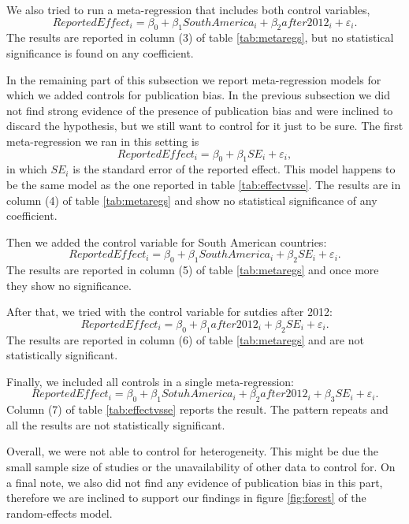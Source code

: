 \documentclass[a4paper, 10pt]{article}
\begin{document}
We also tried to run a meta-regression that includes both control variables,
\begin{equation}
    ReportedEffect_i = \beta_0 + \beta_1 SouthAmerica_i + \beta_2 after2012_i + \varepsilon_i.
\end{equation}
The results are reported in column (3) of table \ref{tab:metaregs}, but no statistical significance is found on any coefficient.

In the remaining part of this subsection we report meta-regression models for which we added controls for publication bias. In the previous subsection we did not find strong evidence of the presence of publication bias and were inclined to discard the hypothesis, but we still want to control for it just to be sure. The first meta-regression we ran in this setting is
\begin{equation}
    ReportedEffect_i = \beta_0 + \beta_1 SE_i + \varepsilon_i,
\end{equation}
in which $SE_i$ is the standard error of the reported effect. This model happens to be the same model as the one reported in table \ref{tab:effectvsse}. The results are in column (4) of table \ref{tab:metaregs} and show no statistical significance of any coefficient.

Then we added the control variable for South American countries:
\begin{equation}
    ReportedEffect_i = \beta_0 + \beta_1 SouthAmerica_i + \beta_2 SE_i + \varepsilon_i.
\end{equation}
The results are reported in column (5) of table \ref{tab:metaregs} and once more they show no significance.

After that, we tried with the control variable for sutdies after 2012:
\begin{equation}
    ReportedEffect_i = \beta_0 + \beta_1 after2012_i + \beta_2 SE_i + \varepsilon_i.
\end{equation}
The results are reported in column (6) of table \ref{tab:metaregs} and are not statistically significant.

Finally, we included all controls in a single meta-regression:
\begin{equation}
    ReportedEffect_i = \beta_0 + \beta_1 SotuhAmerica_i + \beta_2 after2012_i + \beta_3 SE_i + \varepsilon_i.
\end{equation}
Column (7) of table \ref{tab:effectvsse} reports the result. The pattern repeats and all the results are not statistically significant.

Overall, we were not able to control for heterogeneity. This might be due the small sample size of studies or the unavailability of other data to control for. On a final note, we also did not find any evidence of publication bias in this part, therefore we are inclined to support our findings in figure \ref{fig:forest} of the random-effects model.
\end{document}
